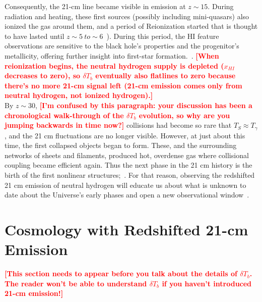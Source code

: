 \documentclass[12pt,a4paper]{report}
\newcommand{\attention}[1]{\textcolor{red}{\bf {#1}}}
\begin{document}
	    
	    Consequently, the 21-cm line became visible in emission at $z\sim15$. During radiation and heating, these first sources (possibly including mini-quasars) also ionized the gas around them, and a period of Reionization started that is thought to have lasted until $z\sim5~to\sim 6$~\citep{2015aska.confE...1K}). During this period, the HI feature observations are sensitive to the black hole's properties and the progenitor's metallicity, offering further insight into first-star formation.~\citep{11}.  \attention{[When reionization begins, the neutral hydrogen supply is depleted ($x_{HI}$ decreases to zero), so $\delta T_b$ eventually also flatlines to zero because there's no more 21-cm signal left (21-cm emission comes only from neutral hydrogen, not ionized hydrogen).]} \\ 
	    
	    By $z\sim 30$, \attention{[I'm confused by this paragraph: your discussion has been a chronological walk-through of the $\delta T_b$ evolution, so why are you jumping backwards in time now?]} collisions had become so rare that $T_S$$\approx$$T_\gamma$ , and the 21 cm fluctuations are no longer visible. However, at just about this time, the first collapsed objects began to form. These, and the surrounding networks of sheets and filaments, produced hot, overdense gas where collisional coupling became efficient again. Thus the next phase in the 21 cm history is the birth of the first nonlinear structures;~\citep{2006PhR...433..181F}. For that reason, observing the redshifted 21 cm emission of neutral hydrogen will educate us about what is unknown to date about the Universe's early phases and open a new observational window~\citep{2015aska.confE...1K}.  
	    
	\section{Cosmology with Redshifted 21-cm Emission}

\attention{[This section needs to appear before you talk about the details of $\delta T_b$.  The reader won't be able to understand $\delta T_b$ if you haven't introduced 21-cm emission!]}
        
	
\end{document}

